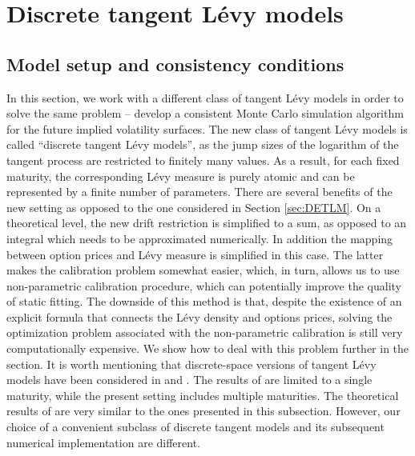 \documentclass{article}
\numberwithin{equation}{section}
\begin{document}
\section{Discrete tangent L\'{e}vy models\label{sec:dtL}}

\subsection{Model setup and consistency conditions} \label{sec:dtL:model}


In this section, we work with a different class of tangent L\'{e}vy models in order to solve the same problem -- develop a consistent Monte Carlo simulation algorithm for the future implied volatility surfaces. The new class of tangent L\'{e}vy models is called ``discrete tangent L\'{e}vy models'', as the jump sizes of the logarithm of the tangent process are restricted to finitely many values. As a result, for each fixed maturity, the corresponding L\'evy measure is purely atomic and can be represented by a finite number of parameters. There are several benefits of the new setting as opposed to the one considered in Section \ref{sec:DETLM}. On a theoretical level, the new drift restriction is simplified to a sum, as opposed to an integral which needs to be approximated numerically. In addition the mapping between option prices and L\'evy measure is simplified in this case. The latter makes the calibration problem somewhat easier, which, in turn, allows us to use non-parametric calibration procedure, which can potentially improve the quality of static fitting. The downside of this method is that, despite the existence of an explicit formula that connects the L\'evy density and options prices, solving the optimization problem associated with the non-parametric calibration is still very computationally expensive. We show how to deal with this problem further in the section. It is worth mentioning that discrete-space versions of tangent L\'evy models have been considered in \cite{Zhao2010dtl} and \cite{emmanuel2014discrete}. The results of \cite{Zhao2010dtl} are limited to a single maturity, while the present setting includes multiple maturities. The theoretical results of \cite{emmanuel2014discrete} are very similar to the ones presented in this subsection. However, our choice of a convenient subclass of discrete tangent models and its subsequent numerical implementation are different. 
\end{document}
